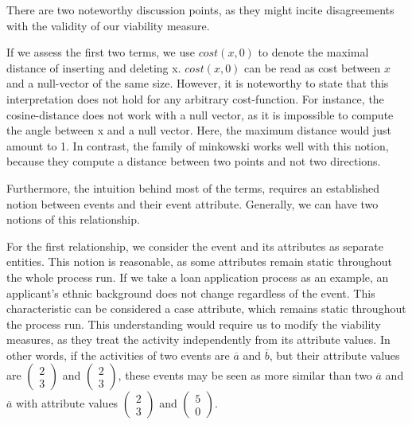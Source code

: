 \documentclass[./../../paper.tex]{subfiles}
\begin{document}
There are two noteworthy discussion points, as they might incite disagreements with the validity of our viability measure. 

If we assess the first two terms, we use $cost(x,0)$ to denote the maximal distance of inserting and deleting x. $cost(x,0)$ can be read as cost between $x$ and a null-vector of the same size. However, it is noteworthy to state that this interpretation does not hold for any arbitrary cost-function. For instance, the cosine-distance does not work with a null vector, as it is impossible to compute the angle between x and a null vector. Here, the maximum distance would just amount to 1. In contrast, the family of \Gls{minkowski} works well with this notion, because they compute a distance between two points and not two directions. 

Furthermore, the intuition behind most of the terms, requires an established notion between events and their event attribute. Generally, we can have two notions of this relationship. 

For the first relationship, we consider the event and its attributes as separate entities. This notion is reasonable, as some attributes remain static throughout the whole process run. If we take a loan application process as an example, an applicant's ethnic background does not change regardless of the event. This characteristic can be considered a case attribute, which remains static throughout the process run. This understanding would require us to modify the viability measures, as they treat the activity independently from its attribute values. In other words, if the activities of two events are $\overline{a}$ and $\overline{b}$, but their attribute values are $\left(\begin{smallmatrix}2 \\ 3\end{smallmatrix}\right)$ and $\left(\begin{smallmatrix}2 \\ 3\end{smallmatrix}\right)$, these events may be seen as more similar than two $\overline{a}$ and $\overline{a}$ with attribute values $\left(\begin{smallmatrix}2 \\ 3\end{smallmatrix}\right)$ and $\left(\begin{smallmatrix}5 \\ 0\end{smallmatrix}\right)$. 
\end{document}

